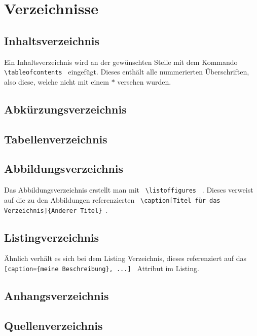 \section{Verzeichnisse}
\subsection{Inhaltsverzeichnis}
Ein Inhaltsverzeichnis wird an der gewünschten Stelle mit dem Kommando 
\lstinline$ \tableofcontents $ eingefügt. Dieses enthält alle nummerierten 
Überschriften, also diese, welche nicht mit einem $*$ versehen wurden.
\subsection{Abkürzungsverzeichnis}

\subsection{Tabellenverzeichnis}
\subsection{Abbildungsverzeichnis}
Das Abbildungsverzeichnis erstellt man mit \lstinline$ \listoffigures $ . 
Dieses verweist auf die zu den Abbildungen referenzierten 
\lstinline $ \caption[Titel für das Verzeichnis]{Anderer Titel} $.
\subsection{Listingverzeichnis}
Ähnlich verhält es sich bei dem Listing Verzeichnis, dieses referenziert auf 
das \lstinline $ [caption={meine Beschreibung}, ...] $ Attribut im Listing.
\subsection{Anhangsverzeichnis}
\subsection{Quellenverzeichnis}



\listoftables %
\lstlistoflistings %